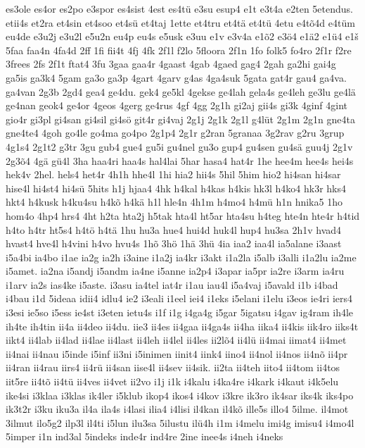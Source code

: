 {es3ole
es4or
es2po
e3spor
es4sist
4est
es4tü
e3su
esup4
e1t
e3t4a
e2ten
5etendus.
etii4s
et2ra
et4sin
et4soo
et4sü
et4taj
1ette
et4tru
et4tä
et4tü
4etu
e4tõ4d
e4tüm
eu4de
e3u2j
e3u2l
e5u2n
eu4p
eu4s
e5usk
e3uu
e1v
e3v4a
e1õ2
e3ö4
e1ä2
e1ü4
e1š
5faa
faa4n
4fa4d
2ff
1fi
fii4t
4fj
4fk
2f1l
f2lo
5floora
2f1n
1fo
folk5
fo4ro
2f1r
f2re
3frees
2fs
2f1t
ftat4
3fu
3gaa
gaa4r
4gaast
4gab
4gaed
gag4
2gah
ga2hi
gai4g
ga5is
ga3k4
5gam
ga3o
ga3p
4gart
4garv
g4as
4ga4suk
5gata
gat4r
gau4
ga4va.
ga4van
2g3b
2gd4
gea4
ge4du.
gek4
ge5kl
4gekse
ge4lah
gela4s
ge4leh
ge3lu
ge4lä
ge4nan
geok4
ge4or
4geos
4gerg
ge4rus
4gf
4gg
2g1h
gi2aj
gii4s
gi3k
4ginf
4gint
gio4r
gi3pl
gi4san
gi4sil
gi4sö
git4r
gi4vaj
2g1j
2g1k
2g1l
g4lüt
2g1m
2g1n
gne4ta
gne4te4
4goh
go4le
go4ma
go4po
2g1p4
2g1r
g2ran
5granaa
3g2rav
g2ru
3grup
4g1s4
2g1t2
g3tr
3gu
gub4
gue4
gu5i
gu4nel
gu3o
gup4
gu4sen
gu4sä
guu4j
2g1v
2g3õ4
4gä
gü4l
3ha
haa4ri
haa4s
hal4lai
5har
hasa4
hat4r
1he
hee4m
hee4s
hei4s
hek4v
2hel.
hels4
het4r
4h1h
hhe4l
1hi
hia2
hii4s
5hil
5him
hio2
hi4san
hi4sar
hise4l
hi4st4
hi4sü
5hits
h1j
hjaa4
4hk
h4kal
h4kas
h4kis
hk3l
h4ko4
hk3r
hks4
hkt4
h4kusk
h4ku4su
h4kõ
h4kä
h1l
hle4n
4h1m
h4mo4
h4mü
h1n
hnika5
1ho
hom4o
4hp4
hrs4
4ht
h2ta
hta2j
h5tak
hta4l
ht5ar
hta4su
h4teg
hte4n
hte4r
h4tid
h4to
h4tr
ht5s4
h4tö
h4tä
1hu
hu3a
hue4
hui4d
huk4l
hup4
hu3sa
2h1v
hvad4
hvast4
hve4l
h4vini
h4vo
hvu4s
1hõ
3hö
1hä
3hü
4ia
iaa2
iaa4l
ia5alane
i3aast
i5a4bi
ia4bo
i1ae
ia2g
ia2h
i3aine
i1a2j
ia4kr
i3akt
i1a2la
i5alb
i3alli
i1a2lu
ia2me
i5amet.
ia2na
i5andj
i5andm
ia4ne
i5anne
ia2p4
i3apar
ia5pr
ia2re
i3arm
ia4ru
i1arv
ia2s
ias4ke
i5aste.
i3asu
ia4tel
iat4r
i1au
iau4l
i5a4vaj
i5avald
i1b
i4bad
i4bau
i1d
5ideaa
idii4
idlu4
ie2
i3eali
i1eel
iei4
i1eks
i5elani
i1elu
i3eos
ie4ri
iers4
i3esi
ie5so
i5ess
ie4st
i3eten
ietu4s
i1f
i1g
i4ga4g
i5gar
5igatsu
i4gav
ig4ram
ih4le
ih4te
ih4tin
ii4a
ii4deo
ii4du.
iie3
ii4es
ii4gaa
ii4ga4s
ii4ha
iika4
ii4kis
iik4ro
iiks4t
iikt4
ii4lab
ii4lad
ii4lae
ii4last
ii4leh
ii4lel
ii4les
ii2lõ4
ii4lü
ii4mai
iimat4
ii4met
ii4nai
ii4nau
i5inde
i5inf
ii3ni
i5inimen
iinit4
iink4
iino4
ii4nol
ii4nos
ii4nõ
ii4pr
ii4ran
ii4rau
iirs4
ii4rü
ii4san
iise4l
ii4sev
ii4sik.
ii2ta
ii4teh
iito4
ii4tom
ii4tos
iit5re
ii4tõ
ii4tü
ii4ves
ii4vet
ii2vo
i1j
i1k
i4kalu
i4ka4re
i4kark
i4kaut
i4k5elu
ike4si
i3klaa
i3klas
ik4ler
i5klub
ikop4
ikos4
i4kov
i3kre
ik3ro
ik4sar
iks4k
iks4po
ik3t2r
i3ku
iku3a
il4a
ila4s
i4lasi
ilia4
i4lisi
il4kan
il4kõ
ille5s
illo4
5ilme.
il4mot
3ilmut
ilo5g2
ilp3l
il4ti
i5lun
ilu3sa
5ilustu
ilü4h
i1m
i4melu
imi4g
imisu4
i4mo4l
5imper
i1n
ind3al
5indeks
inde4r
ind4re
2ine
inee4s
i4neh
i4neks
}
